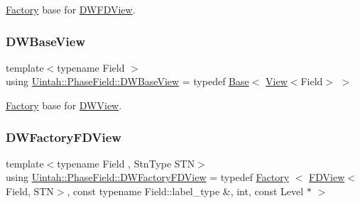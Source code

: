 \hyperlink{classUintah_1_1PhaseField_1_1Factory}{Factory} base for \hyperlink{classUintah_1_1PhaseField_1_1DWFDView}{D\+W\+F\+D\+View}. 

\mbox{\label{namespaceUintah_1_1PhaseField_a84debf843dd25a2f827840a59d1bf021}} 
\subsubsection{\texorpdfstring{D\+W\+Base\+View}{DWBaseView}}
{\footnotesize\ttfamily template$<$typename Field $>$ \\
using \hyperlink{namespaceUintah_1_1PhaseField_a84debf843dd25a2f827840a59d1bf021}{Uintah\+::\+Phase\+Field\+::\+D\+W\+Base\+View} = typedef \hyperlink{classUintah_1_1PhaseField_1_1Base}{Base}$<$ \hyperlink{namespaceUintah_1_1PhaseField_a59210a1e28eba254d428762c92ddeabb}{View}$<$Field$>$ $>$}



\hyperlink{classUintah_1_1PhaseField_1_1Factory}{Factory} base for \hyperlink{classUintah_1_1PhaseField_1_1DWView}{D\+W\+View}. 

\mbox{\label{namespaceUintah_1_1PhaseField_a142a97025a09cbbe9f5a53455a9f32a9}} 
\subsubsection{\texorpdfstring{D\+W\+Factory\+F\+D\+View}{DWFactoryFDView}}
{\footnotesize\ttfamily template$<$typename Field , Stn\+Type S\+TN$>$ \\
using \hyperlink{namespaceUintah_1_1PhaseField_a142a97025a09cbbe9f5a53455a9f32a9}{Uintah\+::\+Phase\+Field\+::\+D\+W\+Factory\+F\+D\+View} = typedef \hyperlink{classUintah_1_1PhaseField_1_1Factory}{Factory} $<$ \hyperlink{namespaceUintah_1_1PhaseField_a63032464b1cd54eaa53c1c29109746ac}{F\+D\+View}$<$Field, S\+TN$>$, const typename Field\+::label\+\_\+type \&, int, const Level $\ast$ $>$}



